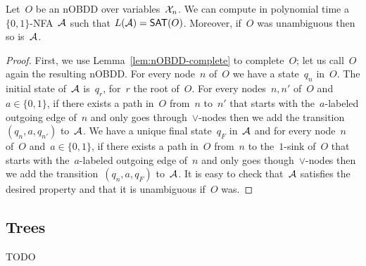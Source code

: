\begin{proposition}[Folklore]
\label{prp:from-uobdds-to-ufas}
Let~$O$ be an nOBDD over variables~$\mathcal{X}_n$. We can compute in polynomial time a~$\{0,1\}$-NFA~$\mathcal{A}$
such that $L(\mathcal{A}) = \mathsf{SAT}(O)$. Moreover, if~$O$ was unambiguous then so is~$\mathcal{A}$.
\end{proposition}
\begin{proof}
First, we use Lemma~\ref{lem:nOBDD-complete} to complete~$O$; let us call~$O$
again the resulting nOBDD.  For every node~$n$ of~$O$ we have a state~$q_n$
in~$O$. The initial state of~$\mathcal{A}$ is~$q_r$, for~$r$ the root of~$O$. For every
nodes~$n,n'$ of~$O$ and~$a\in \{0,1\}$, if there exists a path in~$O$ from~$n$
to~$n'$ that starts with the~$a$-labeled outgoing edge of~$n$ and only goes
through~$\lor$-nodes then we add the transition~$(q_n,a,q_{n'})$ to~$\mathcal{A}$. We
have a unique final state~$q_F$ in~$\mathcal{A}$ and for every node~$n$ of~$O$ and~$a
\in \{0,1\}$, if there exists a path in~$O$ from~$n$ to the~$1$-sink of~$O$
that starts with the~$a$-labeled outgoing edge of~$n$ and only goes
though~$\lor$-nodes then we add the transition~$(q_n,a,q_F)$ to~$\mathcal{A}$.  It is
easy to check that~$\mathcal{A}$ satisfies the desired property and that it is
unambiguous if~$O$ was.
\end{proof}

\subsection{Trees}
TODO
